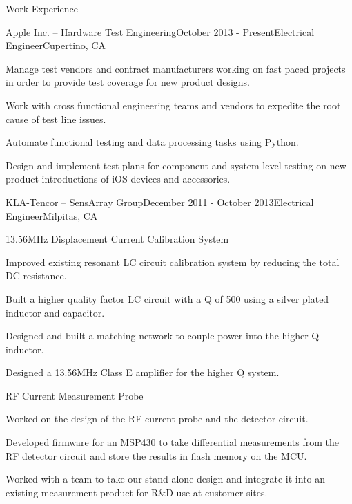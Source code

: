\documentclass{resume} %
\begin{document}
\begin{rSection}{Work Experience}
\begin{rSubsection}{Apple Inc. -- Hardware Test Engineering}{October 2013 - Present}{Electrical Engineer}{Cupertino, CA}
\item Manage test vendors and contract manufacturers working on fast paced projects in order to provide test coverage for new product designs.
\item Work with cross functional engineering teams and vendors to expedite the root cause of test line issues.
\item Automate functional testing and data processing tasks using Python.
\item Design and implement test plans for component and system level testing on new product introductions of iOS devices and accessories.
\end{rSubsection}


\begin{rSubsection2}{KLA-Tencor -- SensArray Group}{December 2011 - October 2013}{Electrical Engineer}{Milpitas, CA}

\begin{rWorkProject}{13.56MHz Displacement Current Calibration System}
\item Improved existing resonant LC circuit calibration system by reducing the total DC resistance.
\item Built a higher quality factor LC circuit with a Q of 500 using a silver plated inductor and capacitor.
\item Designed and built a matching network to couple power into the higher Q inductor.
\item Designed a 13.56MHz Class E amplifier for the higher Q system.
\end{rWorkProject}

\begin{rWorkProject}{RF Current Measurement Probe}
\item Worked on the design of the RF current probe and the detector circuit.
\item Developed firmware for an MSP430 to take differential measurements from the RF detector circuit and store the results in flash memory on the MCU.
\item Worked with a team to take our stand alone design and integrate it into an existing measurement product for R\&D use at customer sites.
\end{rWorkProject}


\end{rSubsection2}
\end{rSection}
\end{document}
